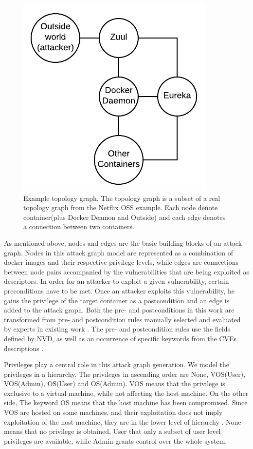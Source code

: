\begin{figure}
	\includegraphics[]{./images/Topology_graph}
	\caption{Example topology graph. The topology graph is a subset of a real topology graph from the Netflix OSS example. Each node denote container(plus Docker Deamon and Outside) and each edge denotes a connection between two containers.}
	\label{TopologyGraph}
\end{figure}

As mentioned above, nodes and edges are the basic building blocks of an attack graph. Nodes in this attack graph model are represented as a combination of docker images and their respective privilege levels, while edges are connections between node pairs accompanied by the vulnerabilities that are being exploited as descriptors. In order for an attacker to exploit a given vulnerability, certain preconditions have to be met. Once an attacker exploits this vulnerability, he gains the privilege of the target container as a postcondition and an edge is added to the attack graph. Both the pre- and postconditions in this work are transformed from pre- and postcondition rules manually selected and evaluated by experts in existing work \cite{aksu2018automated}. The pre- and postcondition rules use the fields defined by NVD, as well as an occurrence of specific keywords from the CVEs descriptions \cite{booth2013national}.

Privileges play a central role in this attack graph generation. We model the privileges in a hierarchy. The privileges in ascending order are None, VOS(User), VOS(Admin), OS(User) and OS(Admin). VOS means that the privilege is exclusive to a virtual machine, while not affecting the host machine. On the other side, The keyword OS means that the host machine has been compromised. Since VOS are hosted on some machines, and their exploitation does not imply exploitation of the host machine, they are in the lower level of hierarchy \cite{aksu2018automated}. None means that no privilege is obtained, User that only a subset of user level privileges are available, while Admin grants control over the whole system.



